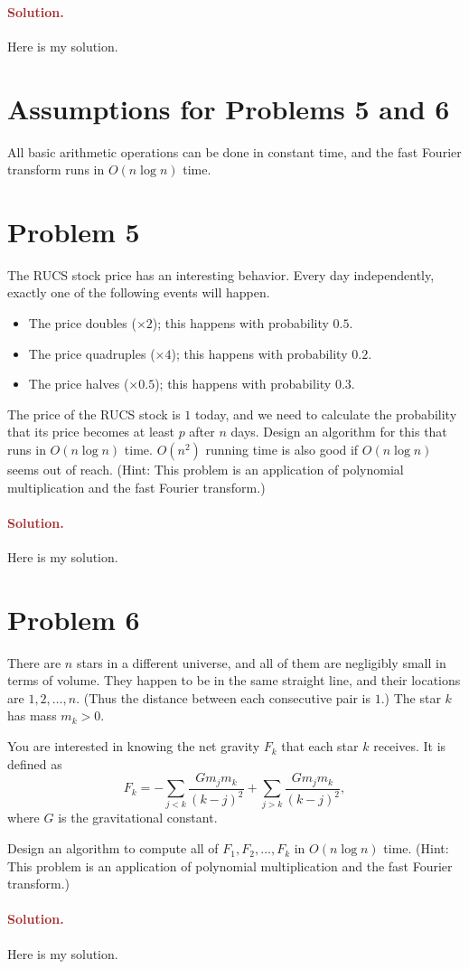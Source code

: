 \paragraph{\textcolor{brown}{Solution.}}
Here is my solution.

\section*{Assumptions for Problems 5 and 6}
All basic arithmetic operations can be done in constant time, and the fast Fourier transform runs in $O(n \log n)$ time.

\section*{Problem 5}
The RUCS stock price has an interesting behavior. Every day independently, exactly one of the following events will happen.
\begin{itemize}
    \item The price doubles ($\times 2$); this happens with probability $0.5$.
    \item The price quadruples ($\times 4$); this happens with probability $0.2$.
    \item The price halves ($\times 0.5$); this happens with probability $0.3$.
\end{itemize}

The price of the RUCS stock is $1$ today, and we need to calculate the probability that its price becomes at least $p$ after $n$ days. Design an algorithm for this that runs in $O(n \log n)$ time. $O(n^2)$ running time is also good if $O(n \log n)$ seems out of reach. (Hint: This problem is an application of polynomial multiplication and the fast Fourier transform.)

\paragraph{\textcolor{brown}{Solution.}}
Here is my solution.

\section*{Problem 6}
There are $n$ stars in a different universe, and all of them are negligibly small in terms of volume. They happen to be in the same straight line, and their locations are $1, 2, \ldots, n$. (Thus the distance between each consecutive pair is $1$.) The star $k$ has mass $m_k > 0$.

You are interested in knowing the net gravity $F_k$ that each star $k$ receives. It is defined as
\[
F_k = -\sum_{j < k} \frac{G m_j m_k}{(k - j)^2} + \sum_{j > k} \frac{G m_j m_k}{(k - j)^2},
\]
where $G$ is the gravitational constant.

Design an algorithm to compute all of $F_1, F_2, \ldots, F_k$ in $O(n \log n)$ time. (Hint: This problem is an application of polynomial multiplication and the fast Fourier transform.)

\paragraph{\textcolor{brown}{Solution.}}
Here is my solution.

